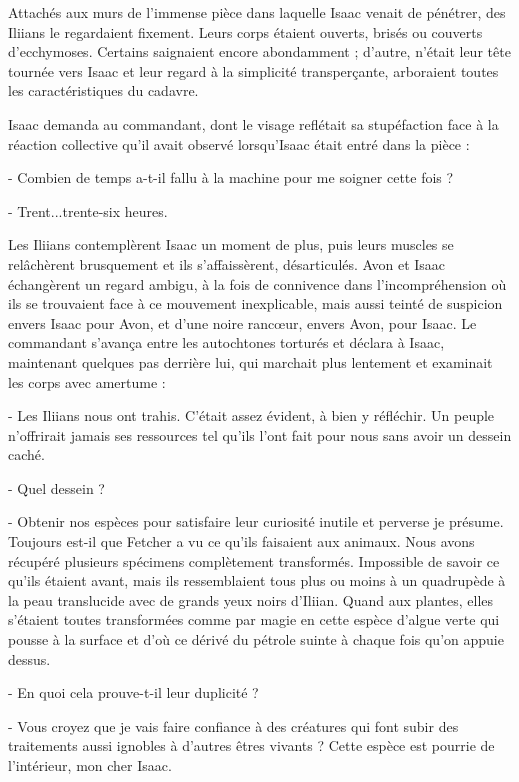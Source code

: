 \documentclass[12pt]{book}
\begin{document}
Attachés aux murs de l'immense pièce dans laquelle Isaac venait de pénétrer, des Iliians le regardaient fixement. Leurs corps étaient ouverts, brisés ou couverts d'ecchymoses. Certains saignaient encore abondamment ; d'autre, n'était leur tête tournée vers Isaac et leur regard à la simplicité transperçante, arboraient toutes les caractéristiques du cadavre.


Isaac demanda au commandant, dont le visage reflétait sa stupéfaction face à la réaction collective qu'il avait observé lorsqu'Isaac était entré dans la pièce :

- Combien de temps a-t-il fallu à la machine pour me soigner cette fois ?

- Trent...trente-six heures.


Les Iliians contemplèrent Isaac un moment de plus, puis leurs muscles se relâchèrent brusquement et ils s'affaissèrent, désarticulés. Avon et Isaac échangèrent un regard ambigu, à la fois de connivence dans l'incompréhension où ils se trouvaient face à ce mouvement inexplicable, mais aussi teinté de suspicion envers Isaac pour Avon, et d'une noire rancœur, envers Avon, pour Isaac. Le commandant s'avança entre les autochtones torturés et déclara à Isaac, maintenant quelques pas derrière lui, qui marchait plus lentement et examinait les corps avec amertume :


- Les Iliians nous ont trahis. C’était assez évident, à bien y réfléchir. Un peuple n'offrirait jamais ses ressources tel qu'ils l'ont fait pour nous sans avoir un dessein caché.

- Quel dessein ?

- Obtenir nos espèces pour satisfaire leur curiosité inutile et perverse je présume. Toujours est-il que Fetcher a vu ce qu'ils faisaient aux animaux. Nous avons récupéré plusieurs spécimens complètement transformés. Impossible de savoir ce qu'ils étaient avant, mais ils ressemblaient tous plus ou moins à un quadrupède à la peau translucide avec de grands yeux noirs d'Iliian. Quand aux plantes, elles s'étaient toutes transformées comme par magie en cette espèce d'algue verte qui pousse à la surface et d'où ce dérivé du pétrole suinte à chaque fois qu'on appuie dessus.

- En quoi cela prouve-t-il leur duplicité ?

- Vous croyez que je vais faire confiance à des créatures qui font subir des traitements aussi ignobles à d'autres êtres vivants ? Cette espèce est pourrie de l'intérieur, mon cher Isaac.
\end{document}
